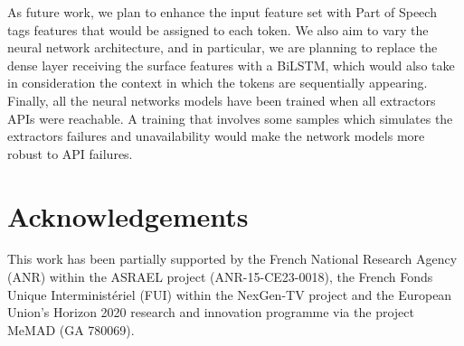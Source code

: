 \documentclass{llncs}
\begin{document}
As future work, we plan to enhance the input feature set with Part of Speech tags features that would be assigned to each token. We also aim
to vary the neural network architecture, and in particular, we are planning to replace the dense layer receiving the surface features with a BiLSTM, which would also take in consideration the context in which the tokens are sequentially appearing. Finally, all the neural networks models have been trained when all extractors APIs were reachable. 
A training that involves some samples which simulates the extractors failures and unavailability would make the network models more robust to API failures.


\section*{Acknowledgements}
This work has been partially supported by the French National Research Agency (ANR) within the ASRAEL project (ANR-15-CE23-0018), the French Fonds Unique Interminist\'eriel (FUI) within the NexGen-TV project and the European  Union's Horizon 2020 research and innovation programme via the project MeMAD (GA 780069).



\end{document}
